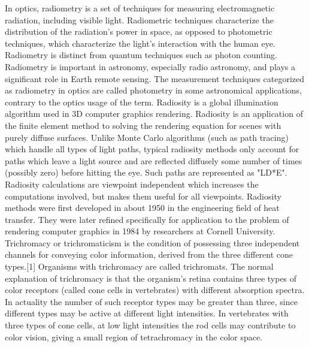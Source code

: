 In optics, radiometry is a set of techniques for measuring electromagnetic radiation, including visible light. Radiometric techniques characterize the distribution of the radiation's power in space, as opposed to photometric techniques, which characterize the light's interaction with the human eye. Radiometry is distinct from quantum techniques such as photon counting.
Radiometry is important in astronomy, especially radio astronomy, and plays a significant role in Earth remote sensing. The measurement techniques categorized as radiometry in optics are called photometry in some astronomical applications, contrary to the optics usage of the term.
Radiosity is a global illumination algorithm used in 3D computer graphics rendering. Radiosity is an application of the finite element method to solving the rendering equation for scenes with purely diffuse surfaces. Unlike Monte Carlo algorithms (such as path tracing) which handle all types of light paths, typical radiosity methods only account for paths which leave a light source and are reflected diffusely some number of times (possibly zero) before hitting the eye. Such paths are represented as "LD*E". Radiosity calculations are viewpoint independent which increases the computations involved, but makes them useful for all viewpoints.
Radiosity methods were first developed in about 1950 in the engineering field of heat transfer. They were later refined specifically for application to the problem of rendering computer graphics in 1984 by researchers at Cornell University.
Trichromacy or trichromaticism is the condition of possessing three independent channels for conveying color information, derived from the three different cone types.[1] Organisms with trichromacy are called trichromats.
The normal explanation of trichromacy is that the organism's retina contains three types of color receptors (called cone cells in vertebrates) with different absorption spectra. In actuality the number of such receptor types may be greater than three, since different types may be active at different light intensities. In vertebrates with three types of cone cells, at low light intensities the rod cells may contribute to color vision, giving a small region of tetrachromacy in the color space.

